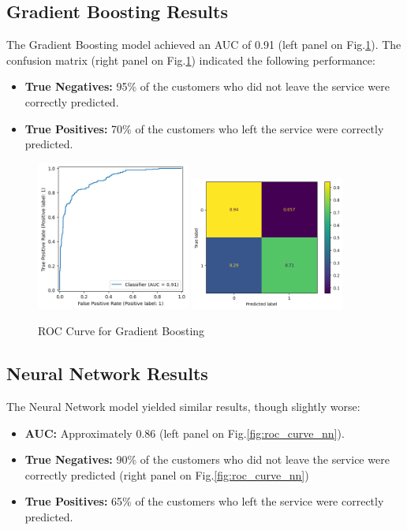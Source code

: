 \documentclass[12pt]{article}
\begin{document}
\subsection{Gradient Boosting Results}
The Gradient Boosting model achieved an AUC of 0.91 (left panel on Fig.\ref{fig:roc_curve_gb}). The confusion matrix (right panel on Fig.\ref{fig:roc_curve_gb}) indicated the following performance:
\begin{itemize}
    \item \textbf{True Negatives:} 95\% of the customers who did not leave the service were correctly predicted.
    \item \textbf{True Positives:} 70\% of the customers who left the service were correctly predicted.
\end{itemize}

\begin{figure}[h!]
    \centering
    \includegraphics[width=0.45\textwidth]{figures/roc_curve_gb.png}
    \includegraphics[width=0.45\textwidth]{figures/confusion_matrix_gb.png}
    \caption{ROC Curve for Gradient Boosting}
    \label{fig:roc_curve_gb}
\end{figure}


\subsection{Neural Network Results}
The Neural Network model yielded similar results, though slightly worse:
\begin{itemize}
    \item \textbf{AUC:} Approximately 0.86 (left panel on Fig.\ref{fig:roc_curve_nn}).
    \item \textbf{True Negatives:} 90\% of the customers who did not leave the service were correctly predicted (right panel on Fig.\ref{fig:roc_curve_nn})
    \item \textbf{True Positives:} 65\% of the customers who left the service were correctly predicted.
\end{itemize}
\end{document}
